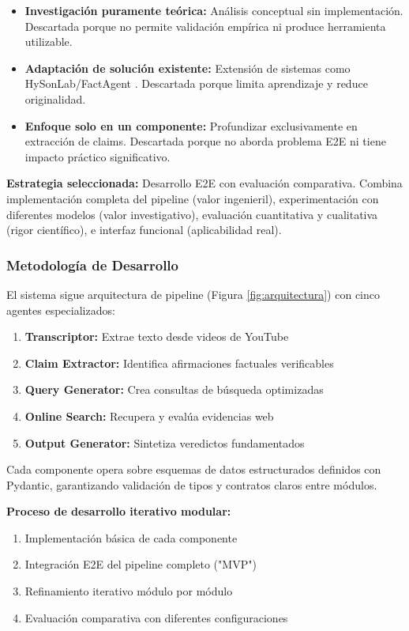 \documentclass[12pt,a4paper,twoside]{book}
\begin{document}
\begin{itemize}
    \item \textbf{Investigación puramente teórica:} Análisis conceptual sin implementación. Descartada porque no permite validación empírica ni produce herramienta utilizable.
    \item \textbf{Adaptación de solución existente:} Extensión de sistemas como HySonLab/FactAgent \citep{hysonlab2025factagent}. Descartada porque limita aprendizaje y reduce originalidad.
    \item \textbf{Enfoque solo en un componente:} Profundizar exclusivamente en extracción de claims. Descartada porque no aborda problema E2E ni tiene impacto práctico significativo.
\end{itemize}

\textbf{Estrategia seleccionada:} Desarrollo E2E con evaluación comparativa. Combina implementación completa del pipeline (valor ingenieril), experimentación con diferentes modelos (valor investigativo), evaluación cuantitativa y cualitativa (rigor científico), e interfaz funcional (aplicabilidad real).

\subsubsection{Metodología de Desarrollo}

El sistema sigue arquitectura de pipeline (Figura \ref{fig:arquitectura}) con cinco agentes especializados:

\begin{enumerate}
    \item \textbf{Transcriptor:} Extrae texto desde videos de YouTube
    \item \textbf{Claim Extractor:} Identifica afirmaciones factuales verificables
    \item \textbf{Query Generator:} Crea consultas de búsqueda optimizadas
    \item \textbf{Online Search:} Recupera y evalúa evidencias web
    \item \textbf{Output Generator:} Sintetiza veredictos fundamentados
\end{enumerate}

Cada componente opera sobre esquemas de datos estructurados definidos con Pydantic, garantizando validación de tipos y contratos claros entre módulos.

\textbf{Proceso de desarrollo iterativo modular:}
\begin{enumerate}
    \item Implementación básica de cada componente
    \item Integración E2E del pipeline completo ("MVP")
    \item Refinamiento iterativo módulo por módulo
    \item Evaluación comparativa con diferentes configuraciones
\end{enumerate}
\end{document}
